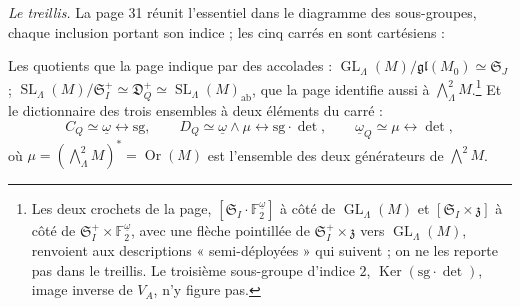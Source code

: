 \documentclass[11pt,a4paper]{article}
\begin{document}
\emph{Le treillis.} La page 31 réunit l'essentiel dans le diagramme des
sous-groupes, chaque inclusion portant son indice ; les cinq carrés en sont
cartésiens :


Les quotients que la page indique par des accolades :
$\operatorname{GL}_\Lambda(M) / \mathfrak{gl}(M_0) \simeq \mathfrak{S}_J$ ;
$\operatorname{SL}_\Lambda(M) / \mathfrak{S}_I^{+} \simeq \mathfrak{D}_Q^{+}
\simeq \operatorname{SL}_\Lambda(M)_{\mathrm{ab}}$, que la page identifie aussi à
$\bigwedge^2_\Lambda M$.\footnote{Les deux crochets de la page,
$[\mathfrak{S}_I \cdot \mathbb{F}_2^{\underline{\omega}}]$ à côté de
$\operatorname{GL}_\Lambda(M)$ et $[\mathfrak{S}_I \times \mathfrak{z}]$ à côté de
$\mathfrak{S}_I^{+} \times \mathbb{F}_2^{\underline{\omega}}$, avec une flèche
pointillée de $\mathfrak{S}_I^{+} \times \mathfrak{z}$ vers
$\operatorname{GL}_\Lambda(M)$, renvoient aux descriptions « semi-déployées » qui
suivent ; on ne les reporte pas dans le treillis. Le troisième sous-groupe
d'indice $2$, $\operatorname{Ker}(\mathrm{sg} \cdot \det)$, image inverse de
$V_A$, n'y figure pas.} Et le dictionnaire des trois ensembles à deux éléments
du carré :
\[
C_Q \simeq \underline{\omega} \leftrightarrow \mathrm{sg}, \qquad
D_Q \simeq \underline{\omega} \wedge \mu \leftrightarrow \mathrm{sg} \cdot \det,
\qquad \underline{\omega}_Q \simeq \mu \leftrightarrow \det,
\]
où $\mu = (\bigwedge^2_\Lambda M)^{*} = \operatorname{Or}(M)$ est l'ensemble des
deux générateurs de $\bigwedge^2 M$.
\end{document}
